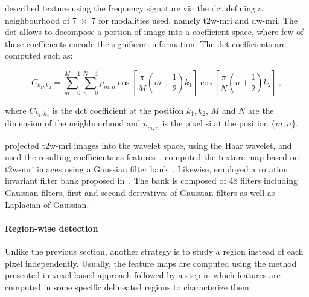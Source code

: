 \citeauthor{Chan2003} described texture using the frequency signature via the \acf{dct}\cite{Ahmed1974} defining a neighbourhood of \SI[product-units=repeat]{7x7}{\px} for modalities used, namely \ac{t2w}-\ac{mri} and \ac{dw}-\ac{mri}.
The \ac{dct} allows to decompose a portion of image into a coefficient space, where few of these coefficients encode the significant information.
The \ac{dct} coefficients are computed such as:

\begin{equation}
	C_{k_1,k_2} = \sum_{m=0}^{M-1} \sum_{n=0}^{N-1} p_{m,n} \cos \left[ \frac{\pi}{M} \left( m + \frac{1}{2} \right) k_1 \right] \cos \left[ \frac{\pi}{N} \left( n + \frac{1}{2} \right) k_2 \right] \ ,
\end{equation}

\noindent where $C_{k_1,k_2}$ is the \ac{dct} coefficient at the position $k_1,k_2$, $M$ and $N$ are the dimension of the neighbourhood and $p_{m,n}$ is the pixel \ac{si} at the position $\{m,n\}$.

\citeauthor{Viswanath2012} projected \ac{t2w}-\ac{mri} images into the wavelet space, using the Haar wavelet, and used the resulting coefficients as features~\cite{Viswanath2012}.
\citeauthor{Litjens2011} computed the texture map based on \ac{t2w}-\ac{mri} images using a Gaussian filter bank~\cite{Litjens2011}.
Likewise, \citeauthor{rampun2016computer} employed a rotation invariant filter bank proposed in~\cite{leung2001representing}.
The bank is composed of 48 filters including Gaussian filters, first and second derivatives of Gaussian filters as well as Laplacian of Gaussian.


\paragraph{Region-wise detection}

Unlike the previous section, another strategy is to study a region instead of each pixel independently.
Usually, the feature maps are computed using the method presented in voxel-based approach followed by a step in which features are computed in some specific delineated regions to characterize them.

